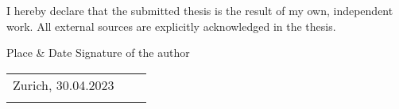 \vspace{2\baselineskip}

\noindent I hereby declare that the submitted thesis is the result of my own, independent work. All external sources are explicitly acknowledged in the thesis.
\vspace{4\baselineskip}

\noindent Place \& Date \hspace{54mm} Signature of the author

\vspace{2\baselineskip}

\noindent \begin{tabular}{@{}p{50mm}p{20mm}p{50mm}@{}}
Zurich, 30.04.2023\\
\hrulefill && \hrulefill
\end{tabular}